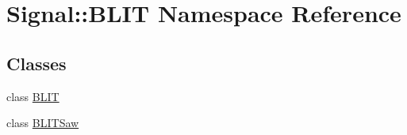 \hypertarget{namespaceSignal_1_1BLIT}{\section{Signal\+:\+:B\+L\+I\+T Namespace Reference}
\label{namespaceSignal_1_1BLIT}
}
\subsection*{Classes}
\begin{DoxyCompactItemize}
\item 
class \hyperlink{classSignal_1_1BLIT_1_1BLIT}{B\+L\+I\+T}
\item 
class \hyperlink{classSignal_1_1BLIT_1_1BLITSaw}{B\+L\+I\+T\+Saw}
\end{DoxyCompactItemize}
